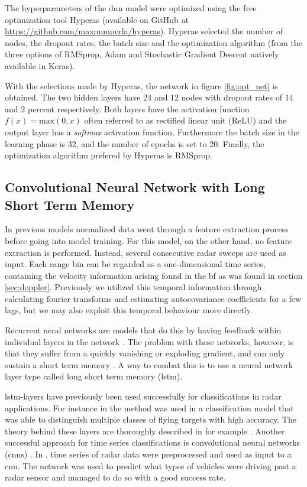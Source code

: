 The hyperparameters of the \gls{dnn} model were optimized using the free optimization tool Hyperas (available on GitHub at \url{https://github.com/maxpumperla/hyperas}). Hyperas selected the number of nodes, the dropout rates, the batch size and the optimization algorithm (from the three options of RMSprop, Adam and Stochastic Gradient Descent natively available in Keras). 

With the selections made by Hyperas, the network in figure \ref{fig:opt_net} is obtained. The two hidden layers have 24 and 12 nodes with dropout rates of 14 and 2 percent respectively. Both layers have the activation function $f(x)=\textrm{max}(0,x)$ often referred to as rectified linear unit (ReLU) and the output layer has a \textit{softmax} activation function. Furthermore the batch size in the learning phase is 32, and the number of epochs is set to 20. Finally, the optimization algorithm prefered by Hyperas is RMSprop.

\subsection{Convolutional Neural Network with Long Short Term Memory}
In previous models normalized data went through a feature extraction process before going into model training. For this model, on the other hand, no feature extraction is performed. Instead, several consecutive radar sweeps are used as input. Each range bin can be regarded as a one-dimensional time series, containing the velocity information arising found in the \gls{bf} as was found in section \ref{sec:doppler}. Previously we utilized this temporal information through calculating fourier transforms and estimating autocovariance coefficients for a few lags, but we may also exploit this temporal behaviour more directly.

Recurrent neral networks are models that do this by having feedback within individual layers in the network \citep{karim_majumdar_darabi_chen_2018}. The problem with these networks, however, is that they suffer from a quickly vanishing or exploding gradient, and can only sustain a short term memory \citep{pascanu_mikolov_bengio_2013}. A way to combat this is to use a neural network layer type called long short term memory (\gls{lstm}).

\gls{lstm}-layers have previously been used successfully for classifications in radar applications. For instance in \citep{jithesh_sagayaraj_srinivasa_2017} the method was used in a classification model that was able to distinguish multiple classes of flying targets with high accuracy. The theory behind these layers are thoroughly described in for example \citep{hochreiter_schmidhuber_1997}. Another successful approach for time series classifications is convolutional neural networks (\gls{cnn}s) \citep{karim_majumdar_darabi_chen_2018}. In \citep{capobianco_facheris_cuccoli_marinai_2018}, time series of radar data were preprocessed and used as input to a \gls{cnn}. The network was used to predict what types of vehicles were driving past a radar sensor and managed to do so with a good success rate.

